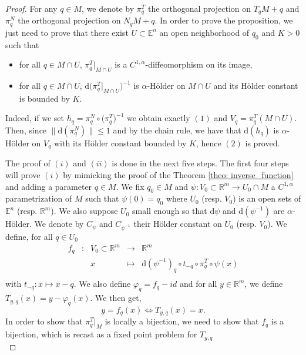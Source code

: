 \documentclass[10pt,a4paper]{amsart}
\newcommand{\E}{\mathbb{E}}
\newcommand{\R}{\mathbb{R}}
\renewcommand{\d}{\mathrm{d}}
\renewcommand{\leq}{\leqslant}
\begin{document}
\begin{proof}
    For any $q \in M$, we denote by $\pi_{q}^T$ the orthogonal projection on $T_q M + q$ and  $\pi_{q}^N$ the orthogonal projection on $N_q M + q$. In order to prove the proposition, we just need to prove that
    there exist $U \subset \E^n$ an open neighborhood of $q_0$ and $K > 0$ such that 
    \begin{itemize}
        \item[(i)] for all $q \in  M \cap U$, $\pi_{q}^T |_{M\cap U}$ is a $C^{1,\alpha}$-diffeomorphism on its image,
        \item[(ii)] for all $q \in  M \cap U$, $\d \big( \pi_{q}^T |_{M\cap U} \big)^{-1}$ is $\alpha$-Hölder on $M \cap U$ and its Hölder constant is bounded by $K$.
    \end{itemize}
    Indeed, if we set $h_{q} = \pi_{q}^N \circ \big( \pi_{q}^T \big)^{-1}$ we obtain exactly $(1)$ and $V_q  = \pi_{q}^T(M\cap U)$.
    Then, since $\| \d (\pi^N_{q})\| \leq 1$ and by the chain rule, we have that $\d (h_{q})$ is $\alpha$-Hölder on $V_{q}$ with its Hölder constant bounded by $K$, hence $(2)$ is proved.
    
    The proof of $(i)$ and $(ii)$ is done in the next five steps.
    The first four steps will prove $(i)$ by mimicking the proof of the Theorem \ref{theo: inverse_function} and adding a parameter $q\in M.$
    We fix $q_0 \in M$ and $\psi : V_0 \subset \R^m \to U_0 \cap M$ a $C^{1,\alpha}$ parametrization of $M$ such that $\psi(0) = q_0$ where $U_0$ (resp. $V_0$) is an open sets of $\E^n$ (resp. $\R^m$).
    We also suppose $U_0$ small enough so that $\d \psi$ and $\d (\psi^{-1})$ are $\alpha$-Hölder.
    We denote by $C_{\psi}$ and $C_{\psi^{-1}}$ their Hölder constant on $U_0$ (resp. $V_0$).
    We define, for all $q \in U_0$
    \[ \begin{array}{ccccc}
    f_q & : & V_0 \subset \R^m & \longrightarrow & \R^m \\
     & & x & \longmapsto & \d (\psi^{-1})_{q} \circ t_{-q}  \circ \pi_{q}^T \circ \psi(x) \\
    \end{array}\]
    with $t_{-q} : x \mapsto x - q$.
    We also define $\varphi_{q} = f_{q} - id$ and
    for all $y \in \R^m$, we define $T_{y,q}(x) = y -\varphi_{q}(x)$. 
    We then get,
    $$ y = f_{q}(x) \iff T_{y,q}(x) = x.$$
    In order to show that $\pi_q^T |_M$ is locally a bijection, we need to show that $f_q$ is a bijection, which is recast as a fixed point problem for $T_{y,q}$\\
    

\end{proof}
\end{document}
